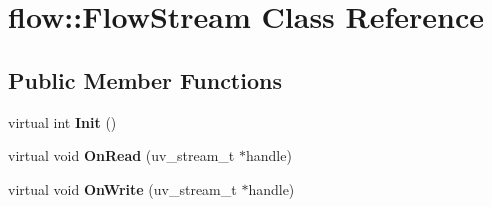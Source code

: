 \hypertarget{classflow_1_1_flow_stream}{}\section{flow\+:\+:Flow\+Stream Class Reference}
\label{classflow_1_1_flow_stream}
\subsection*{Public Member Functions}
\begin{DoxyCompactItemize}
\item 
virtual int {\bfseries Init} ()\hypertarget{classflow_1_1_flow_stream_a4480cdf56adee7453c33600243790fb1}{}\label{classflow_1_1_flow_stream_a4480cdf56adee7453c33600243790fb1}

\item 
virtual void {\bfseries On\+Read} (uv\+\_\+stream\+\_\+t $\ast$handle)\hypertarget{classflow_1_1_flow_stream_a3c8e0aa31cf724ef969afc993b121404}{}\label{classflow_1_1_flow_stream_a3c8e0aa31cf724ef969afc993b121404}

\item 
virtual void {\bfseries On\+Write} (uv\+\_\+stream\+\_\+t $\ast$handle)\hypertarget{classflow_1_1_flow_stream_adefc4109fc2667a7047cfa3524453d40}{}\label{classflow_1_1_flow_stream_adefc4109fc2667a7047cfa3524453d40}

\end{DoxyCompactItemize}
